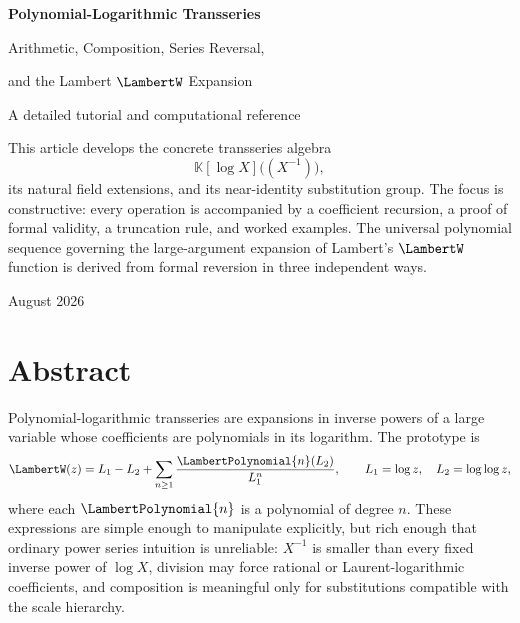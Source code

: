 \documentclass[11pt,oneside,openany]{book}
\newcommand{\K}{\mathbb{K}}
\begin{document}
\frontmatter

\hypersetup{pageanchor=false}
\begin{titlepage}
\thispagestyle{empty}
\centering
\vspace*{1.1in}
{\Huge\bfseries Polynomial-Logarithmic Transseries\par}
\vspace{0.35in}
{\LARGE Arithmetic, Composition, Series Reversal,\par}
\vspace{0.08in}
{\LARGE and the Lambert \(\LambertW\) Expansion\par}
\vspace{0.55in}
{\large A detailed tutorial and computational reference\par}
\vfill
\begin{minipage}{0.80\textwidth}
\small
This article develops the concrete transseries algebra
\[
  \K[\log X]\bigl((X^{-1})\bigr),
\]
its natural field extensions, and its near-identity substitution group.  The
focus is constructive: every operation is accompanied by a coefficient
recursion, a proof of formal validity, a truncation rule, and worked examples.
The universal polynomial sequence governing the large-argument expansion of
Lambert's \(\LambertW\) function is derived from formal reversion in three independent
ways.
\end{minipage}
\vfill
{\large August 2026\par}
\end{titlepage}
\hypersetup{pageanchor=true}
\setcounter{page}{1}

\chapter*{Abstract}
Polynomial-logarithmic transseries are expansions in inverse powers of a large
variable whose coefficients are polynomials in its logarithm.  The prototype is
\[
  \LambertW(z)=L_1-L_2+\sum_{n\geq 1}\frac{\LambertPolynomial{n}(L_2)}{L_1^n},
  \qquad L_1=\log z,\quad L_2=\log\log z,
\]
where each \(\LambertPolynomial{n}\) is a polynomial of degree \(n\).  These expressions are
simple enough to manipulate explicitly, but rich enough that ordinary power
series intuition is unreliable: \(X^{-1}\) is smaller than every fixed inverse
power of \(\log X\), division may force rational or Laurent-logarithmic
coefficients, and composition is meaningful only for substitutions compatible
with the scale hierarchy.
\end{document}
